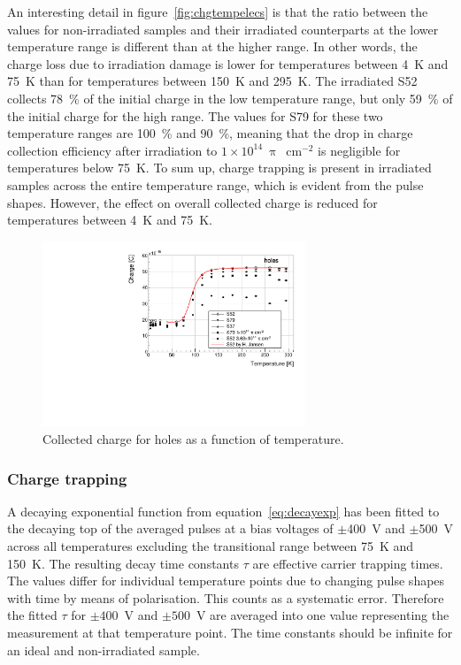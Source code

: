 An interesting detail in figure~\ref{fig:chgtempelecs} is that the ratio between the values for non-irradiated samples and their irradiated counterparts at the lower temperature range is different than at the higher range. In other words, the charge loss due to irradiation damage is lower for temperatures between 4~K and 75~K than for temperatures between 150~K and 295~K. The irradiated S52 collects 78~\% of the initial charge in the low temperature range, but only 59~\% of the initial charge for the high range. The values for S79 for these two temperature ranges are 100~\% and 90~\%, meaning that the drop in charge collection efficiency after irradiation to $1\times10^{14}~\uppi$~cm$^{-2}$ is negligible for temperatures below 75~K. To sum up, charge trapping is present in irradiated samples across the entire temperature range, which is evident from the pulse shapes. However, the effect on overall collected charge is reduced for temperatures between 4~K and 75~K.

\begin{figure}[!t]
\centering
\includegraphics[width=0.70\textwidth]{../scripts/03_experimental_results/plots/charge-500V}
\caption{Collected charge for holes as a function of temperature.}
 \label{fig:chgtempholes}
\end{figure}

\subsubsection{Charge trapping}
A decaying exponential function from equation~\ref{eq:decayexp} has been fitted to the decaying top of the averaged pulses at a bias voltages of $\pm$400~V and $\pm$500~V across all temperatures excluding the transitional range between 75~K and 150~K. The resulting decay time constants $\tau$ are effective carrier trapping times. The values differ for individual temperature points due to changing pulse shapes with time by means of polarisation. This counts as a systematic error. Therefore the fitted $\tau$ for $\pm400$~V and $\pm500$~V are averaged into one value representing the measurement at that temperature point. The time constants should be infinite for an ideal and non-irradiated sample. %

